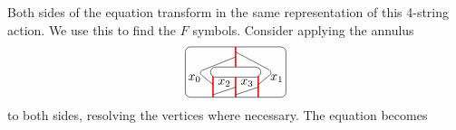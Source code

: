 Both sides of the equation transform in the same representation of this 4-string action. We use this to find the $F$ symbols. Consider applying the annulus
\begin{equation}
\begin{tikzpicture}[scale=0.7,baseline=(current bounding box.center)]
\draw[red,line width=0.4mm](-.9,0)--(-.9,-1);
\draw[red,line width=0.4mm](0,0)--(0,-1);\draw[red,line width=0.4mm](0,.2)--(0,1);
\draw[red,line width=0.4mm](.9,0)--(.9,-1);
\draw[rounded corners] (0,.6)--(-1.5,0)--(-.9,-.5)node[pos=.5,left]{$x_0$};
\draw[rounded corners] (0,.8)--(1.5,0)--(.9,-.5)node[pos=.5,right]{$x_1$};
\draw[rounded corners] (-.9,-.9)--(0,-.6)node[pos=.5,above]{$x_2$};
\draw[rounded corners] (0,-.9)--(.9,-.6)node[pos=.5,above]{$x_3$};
\draw[rounded corners] (-2,-1) rectangle (2,1);
\filldraw[fill=white,rounded corners] (-1,-.2) rectangle (1,.2);
\end{tikzpicture}\label{eqn:Ftransform}
\end{equation}
to both sides, resolving the vertices where necessary. The equation becomes

